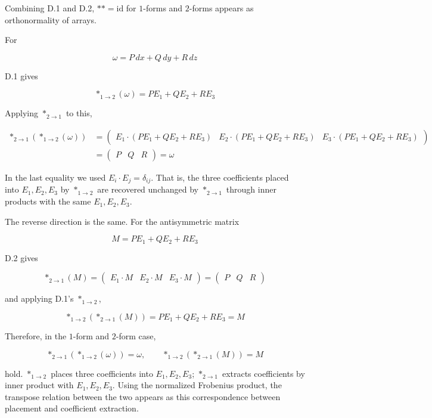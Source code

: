 \documentclass[a4paper,12pt,openany]{book}
\begin{document}
Combining D.1 and D.2, \(\ast\ast=\mathrm{id}\) for \(1\)-forms and
\(2\)-forms appears as orthonormality of arrays.

For

\[
\omega=P\,dx+Q\,dy+R\,dz
\]

D.1 gives

\[
\ast_{1\to2}(\omega)=P E_1+Q E_2+R E_3
\]

Applying \(\ast_{2\to1}\) to this,

\[
\begin{aligned}
\ast_{2\to1}(\ast_{1\to2}(\omega))
&=
\begin{pmatrix}
E_1\cdot (P E_1+Q E_2+R E_3) &
E_2\cdot (P E_1+Q E_2+R E_3) &
E_3\cdot (P E_1+Q E_2+R E_3)
\end{pmatrix} \\
&=
\begin{pmatrix}
P & Q & R
\end{pmatrix}
=
\omega
\end{aligned}
\]

In the last equality we used \(E_i\cdot E_j=\delta_{ij}\). That is, the
three coefficients placed into \(E_1,E_2,E_3\) by \(\ast_{1\to2}\) are
recovered unchanged by \(\ast_{2\to1}\) through inner products with the
same \(E_1,E_2,E_3\).

The reverse direction is the same. For the antisymmetric matrix

\[
M=P E_1+Q E_2+R E_3
\]

D.2 gives

\[
\ast_{2\to1}(M)
=
\begin{pmatrix}
E_1\cdot M & E_2\cdot M & E_3\cdot M
\end{pmatrix}
=
\begin{pmatrix}
P & Q & R
\end{pmatrix}
\]

and applying D.1's \(\ast_{1\to2}\),

\[
\ast_{1\to2}(\ast_{2\to1}(M))
=
P E_1+Q E_2+R E_3
=
M
\]

Therefore, in the \(1\)-form and \(2\)-form case,

\[
\ast_{2\to1}(\ast_{1\to2}(\omega))=\omega,
\qquad
\ast_{1\to2}(\ast_{2\to1}(M))=M
\]

hold. \(\ast_{1\to2}\) places three coefficients into \(E_1,E_2,E_3\);
\(\ast_{2\to1}\) extracts coefficients by inner product with
\(E_1,E_2,E_3\). Using the normalized Frobenius product, the transpose
relation between the two appears as this correspondence between
placement and coefficient extraction.
\end{document}
